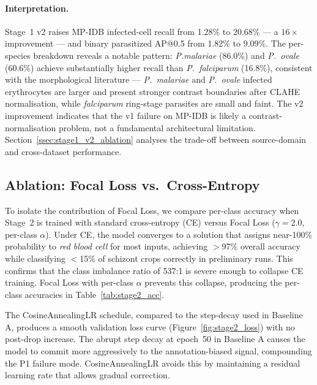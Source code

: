 \documentclass[review,12pt]{elsarticle}
\begin{document}
\paragraph{Interpretation.}
Stage~1 v2 raises MP-IDB infected-cell recall from 1.28\% to 20.68\% ---
a $16\times$ improvement --- and binary parasitized AP@0.5 from 1.82\% to
9.09\%. The per-species breakdown reveals a notable pattern: \textit{P.malariae} (86.0\%) and \textit{P.\ ovale} (60.6\%) achieve substantially
higher recall than \textit{P.\ falciparum} (16.8\%), consistent with the
morphological literature --- \textit{P.\ malariae} and \textit{P.\ ovale}
infected erythrocytes are larger and present stronger contrast boundaries
after CLAHE normalisation, while \textit{falciparum} ring-stage parasites
are small and faint. The v2 improvement indicates that the v1 failure on
MP-IDB is likely a contrast-normalisation problem, not a fundamental architectural
limitation. Section~\ref{ssec:stage1_v2_ablation} analyses the trade-off
between source-domain and cross-dataset performance.

\subsection{Ablation: Focal Loss vs.\ Cross-Entropy}
\label{ssec:ablation}

To isolate the contribution of Focal Loss, we compare per-class accuracy
when Stage~2 is trained with standard cross-entropy (CE) versus Focal Loss
($\gamma = 2.0$, per-class $\alpha$). Under CE, the model converges to a
solution that assigns near-100\% probability to \textit{red blood cell}
for most inputs, achieving $>$97\% overall accuracy while classifying
$<$15\% of schizont crops correctly in preliminary runs. This confirms
that the class imbalance ratio of 537:1 is severe enough to collapse CE
training. Focal Loss with per-class $\alpha$ prevents this collapse,
producing the per-class accuracies in Table~\ref{tab:stage2_acc}.

The CosineAnnealingLR schedule, compared to the step-decay used in
Baseline A, produces a smooth validation loss curve (Figure~\ref{fig:stage2_loss})
with no post-drop increase. The abrupt step decay at epoch~50 in Baseline A
causes the model to commit more aggressively to the annotation-biased signal,
compounding the P1 failure mode. CosineAnnealingLR avoids this by
maintaining a residual learning rate that allows gradual correction.
\end{document}
